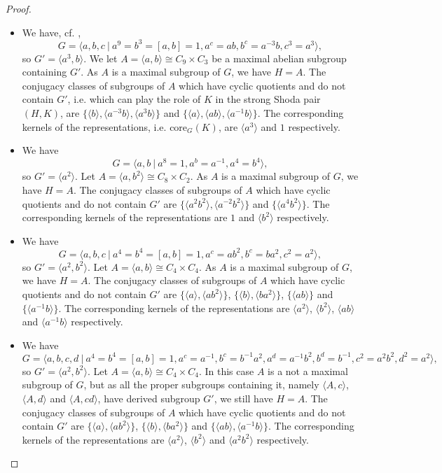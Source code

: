 \documentclass[a4paper,10pt]{amsart}
\theoremstyle{definition}
\theoremstyle{remark}
\begin{document}
\begin{proof}
\begin{itemize}
\item[(BJ4)] We have, cf. \cite[p. 120]{JespersSun},
\[G = \langle a,b,c \ | \ a^9 = b^3 = [a,b] = 1, a^c = ab, b^c = a^{-3}b, c^3 = a^3 \rangle, \]
so $G' = \langle a^3, b \rangle$. We let $A = \langle a, b \rangle \cong C_9 \times C_3$ be a maximal abelian subgroup containing $G'$. As $A$ is a maximal subgroup of $G$, we have $H=A$. The conjugacy classes of subgroups of $A$ which have cyclic quotients and do not contain $G'$, i.e. which can play the role of $K$ in the strong Shoda pair $(H,K)$, are $\{\langle b \rangle, \langle a^{-3}b \rangle, \langle a^3b \rangle \}$ and $\{\langle a \rangle, \langle ab \rangle, \langle a^{-1}b \rangle \}$. The corresponding kernels of the representations, i.e. $\text{core}_G(K)$, are $\langle a^3 \rangle$ and $1$ respectively.
\item[(BJ5)] We have
\[G = \langle a,b \ | \ a^8 = 1, a^b = a^{-1}, a^4 = b^4 \rangle, \]
so $G' = \langle a^2 \rangle$. Let $A = \langle a, b^2 \rangle \cong C_8 \times C_2$. As $A$ is a maximal subgroup of $G$, we have $H=A$. The conjugacy classes of subgroups of $A$ which have cyclic quotients and do not contain $G'$ are $\{\langle a^2b^2 \rangle, \langle a^{-2}b^2 \rangle \}$ and $\{\langle a^4b^2 \rangle \}$. The corresponding kernels of the representations are $1$ and $\langle b^2 \rangle$ respectively.
\item[(BJ8)] We have
\[G = \langle a,b,c \ | \ a^4 = b^4 = [a,b]= 1, a^c = ab^2, b^c=ba^2, c^2=a^2 \rangle, \]
so $G' = \langle a^2, b^2 \rangle$. Let $A = \langle a, b \rangle \cong C_4 \times C_4$. As $A$ is a maximal subgroup of $G$, we have $H=A$. The conjugacy classes of subgroups of $A$ which have cyclic quotients and do not contain $G'$ are $\{\langle a \rangle, \langle ab^2 \rangle \}$, $\{\langle b \rangle, \langle ba^2 \rangle \}$, $\{\langle ab \rangle\}$ and $\{\langle a^{-1}b \rangle\}$. The corresponding kernels of the representations are $\langle a^2 \rangle$, $\langle b^2 \rangle$, $\langle ab \rangle$ and $\langle a^{-1}b \rangle$ respectively.
\item[(BJ9)] We have
\[G = \langle a,b,c,d \ | \ a^4 = b^4 = [a,b]= 1, a^c = a^{-1}, b^c=b^{-1}a^2, a^d = a^{-1}b^2, b^d = b^{-1}, c^2=a^2b^2, d^2=a^2 \rangle, \]
so $G' = \langle a^2, b^2 \rangle$. Let $A = \langle a, b \rangle \cong C_4 \times C_4$. In this case $A$ is a not a maximal subgroup of $G$, but as all the proper subgroups containing it, namely $\langle A, c \rangle$, $\langle A, d \rangle$ and $\langle A, cd \rangle$, have derived subgroup $G'$, we still have $H=A$. The conjugacy classes of subgroups of $A$ which have cyclic quotients and do not contain $G'$ are $\{\langle a \rangle, \langle ab^2 \rangle \}$, $\{\langle b \rangle, \langle ba^2 \rangle \}$ and $\{\langle ab \rangle, \langle a^{-1}b \rangle\}$. The corresponding kernels of the representations are $\langle a^2 \rangle$, $\langle b^2 \rangle$ and $\langle a^2b^2 \rangle$ respectively.

\end{itemize}
\end{proof}
\end{document}
